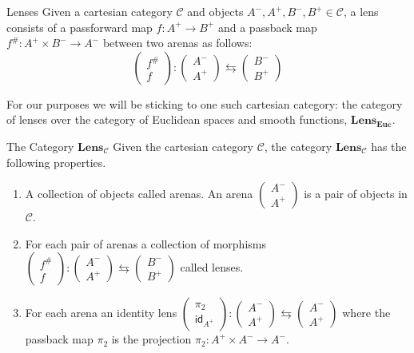 \documentclass[12pt]{article}
\begin{document}
\begin{definition}{Lenses}{}
  Given a cartesian category $\mathcal{C}$ and objects $A^-, A^+, B^-, B^+ \in\mathcal{C}$, a lens consists of a passforward map $f:A^+\rightarrow B^+$ and a passback map $f^\#:A^+ \times B^- \rightarrow A^-$ between two arenas as follows:
  \[
    \begin{pmatrix}f^{\#}\\f\end{pmatrix}:\begin{pmatrix}A^-\\A^+\end{pmatrix}\leftrightarrows\begin{pmatrix}B^-\\B^+\end{pmatrix}
  \]
\end{definition}

For our purposes we will be sticking to one such cartesian category: the category of lenses over the category of Euclidean spaces and smooth functions, $\textbf{Lens}_\textbf{Euc}$.

\begin{definition}{The Category $\textbf{Lens}_\mathcal{C}$}{}
  Given the cartesian category $\mathcal{C}$, the category $\textbf{Lens}_{\mathcal{C}}$ has the following properties.
  \begin{enumerate}
    \item A collection of objects called arenas. An arena $\begin{pmatrix}A^-\\A^+\end{pmatrix}$ is a pair of objects in $\mathcal{C}$.
    \item For each pair of arenas a collection of morphisms $\begin{pmatrix}f^{\#}\\f\end{pmatrix}:\begin{pmatrix}A^-\\A^+\end{pmatrix}\leftrightarrows\begin{pmatrix}B^-\\B^+\end{pmatrix}$ called lenses.
    \item For each arena an identity lens $\begin{pmatrix}\pi_2\\\mathsf{id}_{A^+}\end{pmatrix}:\begin{pmatrix}A^-\\A^+\end{pmatrix}\leftrightarrows\begin{pmatrix}A^-\\A^+\end{pmatrix}$ where the passback map $\pi_2$ is the projection $\pi_2:A^+ \times A^- \rightarrow A^-$.
  \end{enumerate}
\end{definition}
\end{document}
